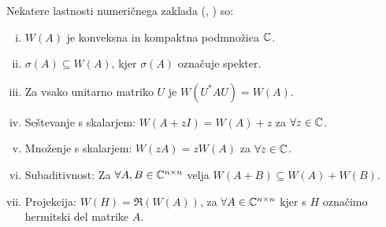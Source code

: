 \documentclass[12pt,a4paper]{amsart}\usepackage[slovene]{babel}%
\theoremstyle{definition}\newtheorem{definicija}{Definicija}[section]\newtheorem{primer}[definicija]{Primer}\newtheorem{opomba}[definicija]{Opomba}
\theoremstyle{plain}\newtheorem{lema}[definicija]{Lema}\newtheorem{izrek}[definicija]{Izrek}\newtheorem{trditev}[definicija]{Trditev}\newtheorem{posledica}[definicija]{Posledica}
\newcommand{\Co}{\operatorname{Co}} %
\begin{document}
{Nekatere lastnosti numeričnega zaklada (\cite{num}, \cite{zaloga}) so:\begin{enumerate}[(i)]\item \label{l1} $W(A)$ je konveksna in kompaktna podmnožica $\mathbb C$.\item \label{l2} $\sigma(A)\subseteq W(A)$, kjer $\sigma(A)$ označuje spekter.\item \label{l3} Za vsako unitarno matriko $U$ je $W(U^\ast AU)=W(A).$\item \label{l4} Seštevanje s skalarjem: $W(A+zI)=W(A)+z$ za $\forall z \in \mathbb C$.\item \label{l5} Množenje s skalarjem: $W(zA)=zW(A)$ za $\forall z \in \mathbb C$.\item \label{l6} Subaditivnost: Za $\forall A, B \in \mathbb C^{n\times n}$ velja $W(A+B) \subseteq W(A) +W(B).$\item \label{l7} Projekcija: $W(H)= \Re( W(A))$, za $\forall A\in \mathbb C^{n\times n}$ kjer s $H$ označimo hermitski del matrike $A$.%

\end{enumerate}}
\end{document}

